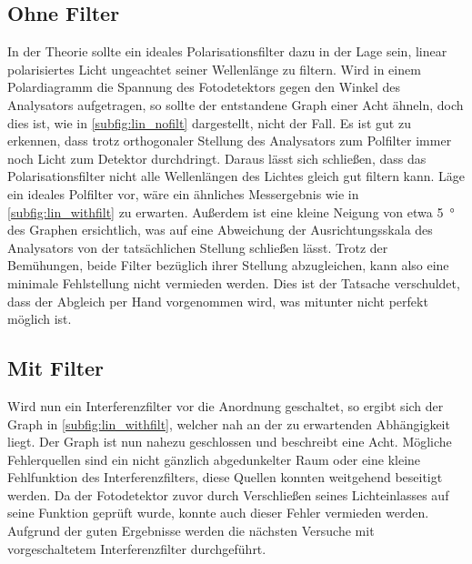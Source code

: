 \subsection{Ohne Filter}
In der Theorie sollte ein ideales Polarisationsfilter dazu in der Lage sein, linear polarisiertes Licht ungeachtet seiner Wellenlänge zu filtern.
Wird in einem Polardiagramm die Spannung des Fotodetektors gegen den Winkel des Analysators aufgetragen, so sollte der entstandene Graph einer Acht ähneln, doch dies ist, wie in \autoref{subfig:lin_nofilt} dargestellt, nicht der Fall.
Es ist gut zu erkennen, dass trotz orthogonaler Stellung des Analysators zum Polfilter immer noch Licht zum Detektor durchdringt.
Daraus lässt sich schließen, dass das Polarisationsfilter nicht alle Wellenlängen des Lichtes gleich gut filtern kann.
Läge ein ideales Polfilter vor, wäre ein ähnliches Messergebnis wie in \autoref{subfig:lin_withfilt} zu erwarten.
Außerdem ist eine kleine Neigung von etwa \SI{5}{\degree} des Graphen ersichtlich, was auf eine Abweichung der Ausrichtungsskala des Analysators von der tatsächlichen Stellung schließen lässt.
Trotz der Bemühungen, beide Filter bezüglich ihrer Stellung abzugleichen, kann also eine minimale Fehlstellung nicht vermieden werden.
Dies ist der Tatsache verschuldet, dass der Abgleich per Hand vorgenommen wird, was mitunter nicht perfekt möglich ist.

\subsection{Mit Filter}
Wird nun ein Interferenzfilter vor die Anordnung geschaltet, so ergibt sich der Graph in \autoref{subfig:lin_withfilt}, welcher nah an der zu erwartenden Abhängigkeit liegt.
Der Graph ist nun nahezu geschlossen und beschreibt eine Acht.
Mögliche Fehlerquellen sind ein nicht gänzlich abgedunkelter Raum oder eine kleine Fehlfunktion des Interferenzfilters, diese Quellen konnten weitgehend beseitigt werden.
Da der Fotodetektor zuvor durch Verschließen seines Lichteinlasses auf seine Funktion geprüft wurde, konnte auch dieser Fehler vermieden werden. 
Aufgrund der guten Ergebnisse werden die nächsten Versuche mit vorgeschaltetem Interferenzfilter durchgeführt.

